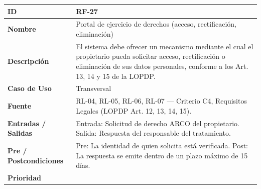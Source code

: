 \documentclass[
]{article}
\newcounter{none} %
\begin{document}
{\def\LTcaptype{none} %
\begin{longtable}[]{|
  >{\raggedright\arraybackslash}p{}|
  >{\raggedright\arraybackslash}p{}|}
\hline
\begin{minipage}[b]{\linewidth}\raggedright
\textbf{ID}
\end{minipage} & \begin{minipage}[b]{\linewidth}\raggedright
RF-27
\end{minipage} \\
\hline
\endhead
\hline
\endlastfoot
\textbf{Nombre} & \begin{minipage}[t]{\linewidth}\raggedright
Portal de ejercicio de derechos (acceso, rectificación, eliminación)
\end{minipage} \\
\hline
\textbf{Descripción} & \begin{minipage}[t]{\linewidth}\raggedright
El sistema debe ofrecer un mecanismo mediante el cual el propietario pueda solicitar acceso, rectificación o eliminación de sus datos personales, conforme a los Art. 13, 14 y 15 de la LOPDP.
\end{minipage} \\
\hline
\textbf{Caso de Uso} & \begin{minipage}[t]{\linewidth}\raggedright
Transversal
\end{minipage} \\
\hline
\textbf{Fuente} & \begin{minipage}[t]{\linewidth}\raggedright
RL-04, RL-05, RL-06, RL-07 — Criterio C4, Requisitos Legales (LOPDP Art. 12, 13, 14, 15).
\end{minipage} \\
\hline
\textbf{Entradas / Salidas} & \begin{minipage}[t]{\linewidth}\raggedright
Entrada: Solicitud de derecho ARCO del propietario. Salida: Respuesta del responsable del tratamiento.
\end{minipage} \\
\hline
\textbf{Pre / Postcondiciones} & \begin{minipage}[t]{\linewidth}\raggedright
Pre: La identidad de quien solicita está verificada. Post: La respuesta se emite dentro de un plazo máximo de 15 días.
\end{minipage} \\
\hline
\textbf{Prioridad} & \begin{minipage}[t]{\linewidth}\raggedright

\end{minipage}
\end{longtable}}
\end{document}
